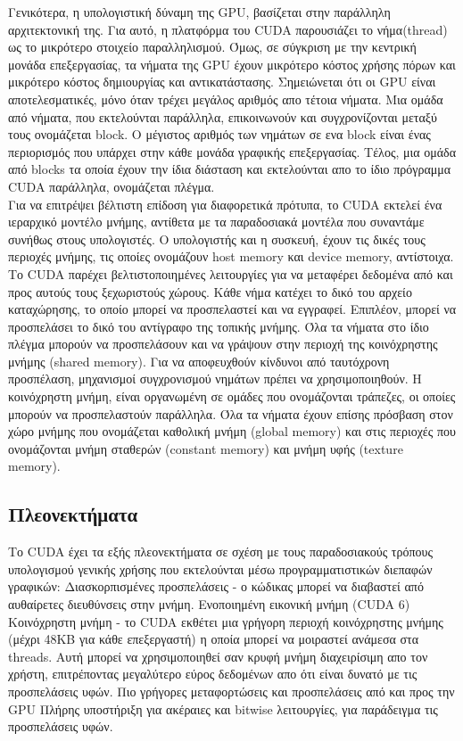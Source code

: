 Γενικότερα, η υπολογιστική δύναμη της GPU, βασίζεται στην παράλληλη αρχιτεκτονική της. Για αυτό, η πλατφόρμα του CUDA παρουσιάζει το νήμα(thread) ως το μικρότερο στοιχείο παραλληλισμού. Όμως, σε σύγκριση με την κεντρική μονάδα επεξεργασίας, τα νήματα της GPU έχουν μικρότερο κόστος χρήσης πόρων και μικρότερο κόστος δημιουργίας και αντικατάστασης. Σημειώνεται ότι οι GPU είναι αποτελεσματικές, μόνο όταν τρέχει μεγάλος αριθμός απο τέτοια νήματα. Μια ομάδα από νήματα, που εκτελούνται παράλληλα, επικοινωνούν και συγχρονίζονται μεταξύ τους ονομάζεται block. Ο μέγιστος αριθμός των νημάτων σε ενα block είναι ένας περιορισμός που υπάρχει στην κάθε μονάδα γραφικής επεξεργασίας. Τέλος, μια ομάδα από blocks τα οποία έχουν την ίδια διάσταση και εκτελούνται απο το ίδιο πρόγραμμα CUDA παράλληλα, ονομάζεται πλέγμα.\\
Για να επιτρέψει βέλτιστη επίδοση για διαφορετικά πρότυπα, το CUDA εκτελεί ένα ιεραρχικό μοντέλο μνήμης, αντίθετα με τα παραδοσιακά μοντέλα που συναντάμε συνήθως στους υπολογιστές. Ο υπολογιστής και η συσκευή, έχουν τις δικές τους περιοχές μνήμης, τις οποίες ονομάζουν host memory και device memory, αντίστοιχα. Το CUDA παρέχει βελτιστοποιημένες λειτουργίες για να μεταφέρει δεδομένα από και προς αυτούς τους ξεχωριστούς χώρους.
Κάθε νήμα κατέχει το δικό του αρχείο καταχώρησης, το οποίο μπορεί να προσπελαστεί και να εγγραφεί. Επιπλέον, μπορεί να προσπελάσει το δικό του αντίγραφο της τοπικής μνήμης. Όλα τα νήματα στο ίδιο πλέγμα μπορούν να προσπελάσουν και να γράψουν στην περιοχή της κοινόχρηστης μνήμης (shared memory). Για να αποφευχθούν κίνδυνοι από ταυτόχρονη προσπέλαση, μηχανισμοί συγχρονισμού νημάτων πρέπει να χρησιμοποιηθούν. Η κοινόχρηστη μνήμη, είναι οργανωμένη σε ομάδες που ονομάζονται τράπεζες, οι οποίες μπορούν να προσπελαστούν παράλληλα. Όλα τα νήματα έχουν επίσης πρόσβαση στον χώρο μνήμης που ονομάζεται καθολική μνήμη (global memory) και στις περιοχές που ονομάζονται μνήμη σταθερών (constant memory) και μνήμη υφής (texture memory).

\subsection{Πλεονεκτήματα}
Το CUDA έχει τα εξής πλεονεκτήματα σε σχέση με τους παραδοσιακούς τρόπους υπολογισμού γενικής χρήσης που εκτελούνται μέσω προγραμματιστικών διεπαφών γραφικών:
 Διασκορπισμένες προσπελάσεις - ο κώδικας μπορεί να διαβαστεί από αυθαίρετες διευθύνσεις στην μνήμη.
 Ενοποιημένη εικονική μνήμη (CUDA 6)
 Κοινόχρηστη μνήμη - το CUDA εκθέτει μια γρήγορη περιοχή κοινόχρηστης μνήμης (μέχρι 48KB για κάθε επεξεργαστή) η οποία μπορεί να μοιραστεί ανάμεσα στα threads. Αυτή μπορεί να χρησιμοποιηθεί σαν κρυφή μνήμη διαχειρίσιμη απο τον χρήστη, επιτρέποντας μεγαλύτερο εύρος δεδομένων απο ότι είναι δυνατό με τις προσπελάσεις υφών.
 Πιο γρήγορες μεταφορτώσεις και προσπελάσεις από και προς την GPU
 Πλήρης υποστήριξη για ακέραιες και bitwise λειτουργίες, για παράδειγμα τις προσπελάσεις υφών.
